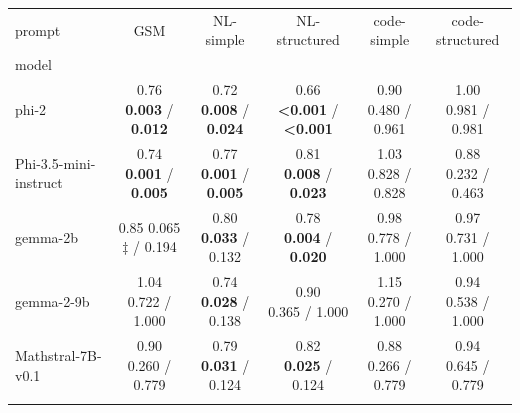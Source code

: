 \documentclass[11pt]{article}
\begin{document}
\begin{table}[H]
\small
\centering
\begin{tabular}{lccccc}
\toprule
prompt & GSM & NL-simple & NL-structured & code-simple & code-structured \\
model &  &  &  &  &  \\
\midrule
phi-2 & \makecell{0.76 \\ \textbf{0.003} / \textbf{0.012}} & \makecell{0.72 \\ \textbf{0.008} / \textbf{0.024}} & \makecell{0.66 \\ \textbf{<0.001} / \textbf{<0.001}} & \makecell{0.90 \\ 0.480 / 0.961} & \makecell{1.00 \\ 0.981 / 0.981} \\ \addlinespace
Phi-3.5-mini-instruct & \makecell{0.74 \\ \textbf{0.001} / \textbf{0.005}} & \makecell{0.77 \\ \textbf{0.001} / \textbf{0.005}} & \makecell{0.81 \\ \textbf{0.008} / \textbf{0.023}} & \makecell{1.03 \\ 0.828 / 0.828} & \makecell{0.88 \\ 0.232 / 0.463} \\ \addlinespace
gemma-2b & \makecell{0.85 \\ 0.065 $\ddagger$ / 0.194} & \makecell{0.80 \\ \textbf{0.033} / 0.132} & \makecell{0.78 \\ \textbf{0.004} / \textbf{0.020}} & \makecell{0.98 \\ 0.778 / 1.000} & \makecell{0.97 \\ 0.731 / 1.000} \\ \addlinespace
gemma-2-9b & \makecell{1.04 \\ 0.722 / 1.000} & \makecell{0.74 \\ \textbf{0.028} / 0.138} & \makecell{0.90 \\ 0.365 / 1.000} & \makecell{1.15 \\ 0.270 / 1.000} & \makecell{0.94 \\ 0.538 / 1.000} \\ \addlinespace
Mathstral-7B-v0.1 & \makecell{0.90 \\ 0.260 / 0.779} & \makecell{0.79 \\ \textbf{0.031} / 0.124} & \makecell{0.82 \\ \textbf{0.025} / 0.124} & \makecell{0.88 \\ 0.266 / 0.779} & \makecell{0.94 \\ 0.645 / 0.779} \\ \addlinespace

\end{tabular}
\end{table}
\end{document}
